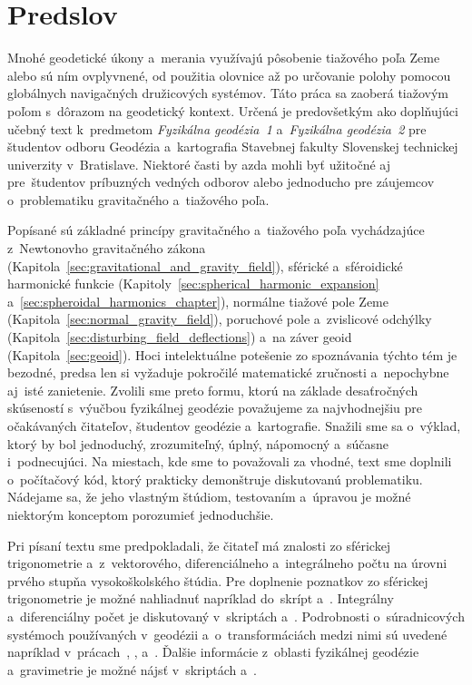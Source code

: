 \documentclass[a4paper, 12pt]{book}
\begin{document}

\chapter*{Predslov}

Mnohé geodetické úkony a~merania využívajú pôsobenie tiažového poľa Zeme alebo 
sú ním ovplyvnené, od použitia olovnice až po určovanie polohy pomocou 
globálnych navigačných družicových systémov.  Táto práca sa zaoberá tiažovým 
poľom s~dôrazom na geodetický kontext.  Určená je predovšetkým ako doplňujúci 
učebný text k~predmetom \emph{Fyzikálna geodézia~1} a~\emph{Fyzikálna 
geodézia~2} pre študentov odboru Geodézia a~kartografia Stavebnej fakulty 
Slovenskej technickej univerzity v~Bratislave.  Niektoré časti by azda mohli 
byť užitočné aj pre~študentov príbuzných vedných odborov alebo jednoducho pre 
záujemcov o~problematiku gravitačného a~tiažového poľa.

Popísané sú základné princípy gravitačného a~tiažového poľa vychádzajúce 
z~Newtonovho gravitačného zákona 
(Kapitola~\ref{sec:gravitational_and_gravity_field}), sférické a~sféroidické 
harmonické funkcie (Kapitoly~\ref{sec:spherical_harmonic_expansion} 
a~\ref{sec:spheroidal_harmonics_chapter}), normálne tiažové pole Zeme 
(Kapitola~\ref{sec:normal_gravity_field}), poruchové pole a~zvislicové odchýlky 
(Kapitola~\ref{sec:disturbing_field_deflections}) a~na záver geoid 
(Kapitola~\ref{sec:geoid}).  Hoci intelektuálne potešenie zo spoznávania týchto 
tém je bezodné, predsa len si vyžaduje pokročilé matematické zručnosti 
a~nepochybne aj~isté zanietenie.  Zvolili sme preto formu, ktorú na základe 
desaťročných skúseností s~výučbou fyzikálnej geodézie považujeme za 
najvhodnejšiu pre očakávaných čitateľov, študentov geodézie a~kartografie.  
Snažili sme sa o~výklad, ktorý by bol jednoduchý, zrozumiteľný, úplný, 
nápomocný a~súčasne i~podnecujúci.  Na miestach, kde sme to považovali za 
vhodné, text sme doplnili o~počítačový kód, ktorý prakticky demonštruje 
diskutovanú problematiku.  Nádejame sa, že jeho vlastným štúdiom, testovaním 
a~úpravou je možné niektorým konceptom porozumieť jednoduchšie.

Pri písaní textu sme predpokladali, že čitateľ má znalosti zo sférickej 
trigonometrie a~z~vektorového, diferenciálneho a~integrálneho počtu na úrovni 
prvého stupňa vysokoškolského štúdia.  Pre doplnenie poznatkov zo sférickej 
trigonometrie je možné nahliadnuť napríklad do~skrípt \textcite{Husar2017} 
a~\textcite{Minarechova2019}.  Integrálny a~diferenciálny počet je diskutovaný 
v~skriptách \textcite{Minarechova2019} a~\textcite{Macak2021}.  Podrobnosti 
o~súradnicových systémoch používaných v~geodézii a~o~transformáciách medzi nimi 
sú uvedené napríklad v~prácach~\textcite{Melicher1993}, 
\textcite{Kostelecky2008}, \textcite{Melicher2009} a~\textcite{Husar2017}.  
Ďalšie informácie z~oblasti fyzikálnej geodézie a~gravimetrie je možné nájsť 
v~skriptách \textcite{Janak2006} a~\textcite{Janak2010}.
\end{document}
